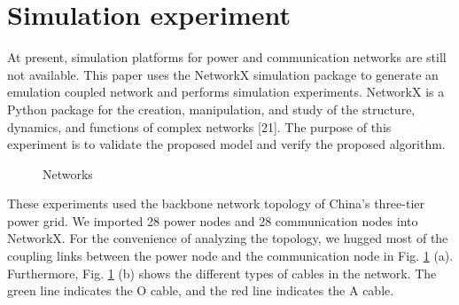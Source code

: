 \documentclass[AMA,STIX1COL]{WileyNJD-v2}
\begin{document}
\section{Simulation experiment}
\par At present, simulation platforms for power and communication networks are still not available. This paper uses the NetworkX simulation package to generate an emulation coupled network and performs simulation experiments. NetworkX is a Python package for the creation, manipulation, and study of the structure, dynamics, and functions of complex networks [21]. The purpose of this experiment is to validate the proposed model and verify the proposed algorithm.
\begin{figure}[htbp]
\centering                                                          %
\caption{Networks} %
\label{Networks}
\end{figure}
\par These experiments used the backbone network topology of China's three-tier power grid. We imported 28 power nodes and 28 communication nodes into NetworkX. For the convenience of analyzing the topology, we hugged most of the coupling links between the power node and the communication node in Fig. \ref{Networks} (a). Furthermore, Fig. \ref{Networks} (b) shows the different types of cables in the network. The green line indicates the O cable, and the red line indicates the A cable.
\end{document}
